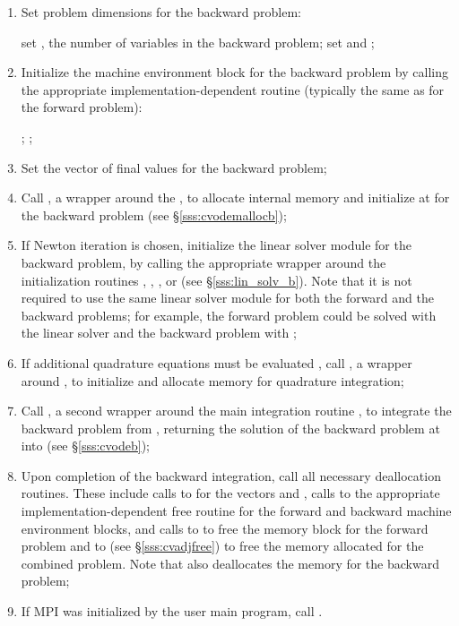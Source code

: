 \begin{enumerate}
\item \label{i:back_start}
  Set problem dimensions for the backward problem:

  {\s} set , the number of variables in the backward problem;
  {\p} set  and ;

\item
  Initialize the machine environment block for the backward problem by calling 
  the appropriate implementation-dependent {\nvector} routine
  (typically the same as for the forward problem):
  
  {\s} ; {\p} ;

\item
  Set the vector  of final values for the backward problem;

\item
  Call , a wrapper around the , to 
  allocate internal memory and initialize {\cvodes} at  for 
  the backward problem (see \S\ref{sss:cvodemallocb});

\item \label{i:lin_solverB}
  If Newton iteration is chosen, initialize the linear solver module 
  for the backward problem, by calling the appropriate wrapper around 
  the initialization routines , , ,
  or  (see \S\ref{sss:lin_solv_b}). Note that it is not required
  to use the same linear solver module for both the forward and the 
  backward problems; for example, the forward problem could be solved
  with the {\cvdense} linear solver and the backward problem with {\cvspgmr};

\item \label{i:quadB}
  If additional quadrature equations must be evaluated , 
  call , a wrapper around ,
  to initialize and allocate memory for quadrature integration;

\item \label{i:back_end}
  Call , a second wrapper around the {\cvodes} main integration
  routine , to integrate the backward problem from , 
  returning the solution of the backward problem at  into
   (see \S\ref{sss:cvodeb});

\item
  Upon completion of the backward integration, call all necessary deallocation
  routines. These include calls to  for the vectors  and ,
  calls to the appropriate implementation-dependent {\nvector} free routine for
  the forward and backward machine environment blocks, and calls to 
  to free the {\cvodes} memory block for the forward problem and to
   (see \S\ref{sss:cvadjfree}) to free the memory allocated for the 
  combined problem. Note that  also deallocates the {\cvodes} memory 
  for the backward problem;

\item
  {\p} If MPI was initialized by the user main program, call .

\end{enumerate}

